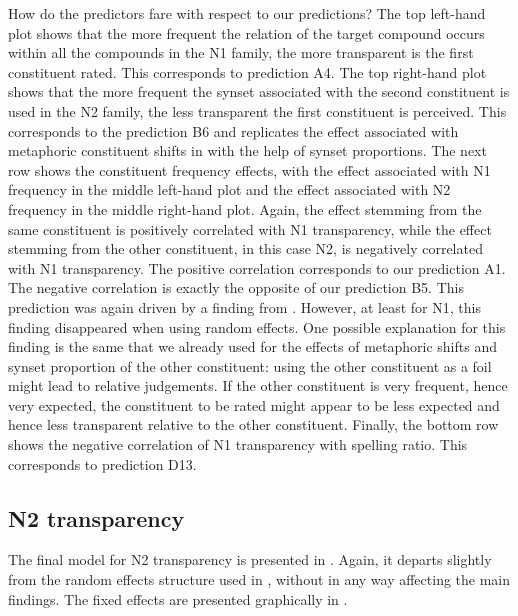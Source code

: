 How do the predictors fare with respect to our predictions? The top
left-hand plot shows that the more frequent the relation of the target
compound occurs within all the compounds in the N1 family, the more
transparent is the first constituent rated. This corresponds to
prediction A4. The top right-hand plot shows that the more frequent
the synset associated with the second constituent is used in the N2
family, the less transparent the first constituent is perceived. This
corresponds to the prediction B6 and replicates the effect associated
with metaphoric constituent shifts in
\citet{BellandSchaefer:2013} with the help of synset proportions. The
next row shows the constituent frequency effects, with the effect
associated with N1 frequency in the middle left-hand plot and the
effect associated with N2 frequency in the middle right-hand
plot. Again, the effect stemming from the same constituent is
positively correlated with N1 transparency, while the effect stemming from the other constituent, in this case
N2, is negatively correlated with N1 transparency. The positive
correlation corresponds to our prediction A1. The negative correlation
is exactly the opposite of our prediction B5. This prediction was
again driven by a finding from \citet{BellandSchaefer:2013}. However,
at least for N1, this finding disappeared when using random
effects. One possible explanation for this finding is the same that we
already used for the effects of metaphoric shifts and synset
proportion of the other constituent: using the other constituent as a
foil might lead to relative judgements. If the other constituent is
very frequent, hence very expected, the constituent to be rated might
appear to be less expected and hence less transparent relative to the
other constituent. Finally, the bottom row shows the negative
correlation of N1 transparency with spelling ratio. This corresponds
to prediction D13. 


\subsection{N2 transparency}
\label{sec:bellschaefer2016n2}

The final model for N2 transparency is presented in
. Again, it departs
slightly from the random effects structure used in
\citet{BellandSchaefer:2016}, without in any way affecting the main
findings. The fixed effects are
presented graphically in . 

